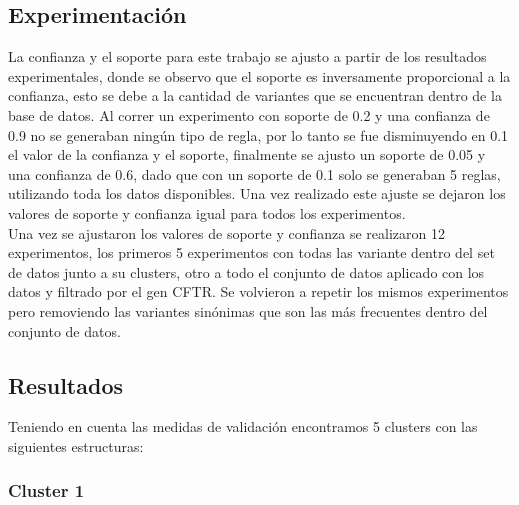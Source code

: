 \subsection{Experimentación}

La confianza y el soporte para este trabajo se ajusto a partir de los resultados experimentales, donde se observo que el soporte es inversamente proporcional a la confianza, esto se debe a la cantidad de variantes que se encuentran dentro de la base de datos. Al correr un experimento con soporte de 0.2 y una confianza de 0.9 no se generaban ningún tipo de regla, por lo tanto se fue disminuyendo en 0.1 el valor de la confianza y el soporte, finalmente se ajusto un soporte de 0.05 y una confianza de 0.6, dado que con un soporte de 0.1 solo se generaban 5 reglas, utilizando toda los datos disponibles. Una vez realizado este ajuste se dejaron los valores de soporte y confianza igual para todos los experimentos.\\

Una vez se ajustaron los valores de soporte y confianza se realizaron 12 experimentos, los primeros 5 experimentos con todas las variante dentro del set de datos junto a su clusters, otro a todo el conjunto de datos aplicado con los datos y filtrado por el gen CFTR. Se volvieron a repetir los mismos experimentos pero removiendo las variantes sinónimas que son las más frecuentes dentro del conjunto de datos.


\subsection{Resultados} 

Teniendo en cuenta las medidas de validación encontramos  5 clusters con las siguientes estructuras:

\subsubsection*{Cluster 1}

